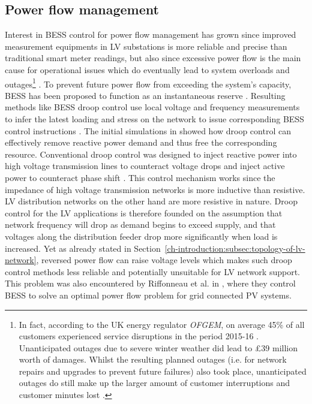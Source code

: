 \subsection{Power flow management}
\label{ch-literature:subsec:power-flow-management}

Interest in BESS control for power flow management has grown since improved measurement equipments in LV substations is more reliable and precise than traditional smart meter readings, but also since excessive power flow is the main cause for operational issues which do eventually lead to system overloads and outages\footnote{
In fact, according to the UK energy regulator \textit{OFGEM}, on average 45\% of all customers experienced service disruptions in the period 2015-16 \cite{Ofgem2017}.
Unanticipated outages due to severe winter weather did lead to \pounds39 million worth of damages.
Whilst the resulting planned outages (i.e. for network repairs and upgrades to prevent future failures) also took place, unanticipated outages do still make up the larger amount of customer interruptions and customer minutes lost \cite{Ofgem2014}.
} \cite{Putrus2009, Pillai2010}.
To prevent future power flow from exceeding the system's capacity, BESS has been proposed to function as an instantaneous reserve \cite{Kunisch1986a, Kunisch1986}.
Resulting methods like BESS droop control use local voltage and frequency measurements to infer the latest loading and stress on the network to issue corresponding BESS control instructions \cite{Engler2005a}.
The initial simulations in \cite{Engler2005a} showed how droop control can effectively remove reactive power demand and thus free the corresponding resource. 
Conventional droop control was designed to inject reactive power into high voltage transmission lines to counteract voltage drops and inject active power to counteract phase shift \cite{Tayab2017}.
This control mechanism works since the impedance of high voltage transmission networks is more inductive than resistive.
LV distribution networks on the other hand are more resistive in nature.
Droop control for the LV applications is therefore founded on the assumption that network frequency will drop as demand begins to exceed supply, and that voltages along the distribution feeder drop more significantly when load is increased.
Yet as already stated in Section~\ref{ch-introduction:subsec:topology-of-lv-network}, reversed power flow can raise voltage levels which makes such droop control methods less reliable and potentially unsuitable for LV network support.
This problem was also encountered by Riffonneau et al. in \cite{Riffonneau2011}, where they control BESS to solve an optimal power flow problem for grid connected PV systems.
